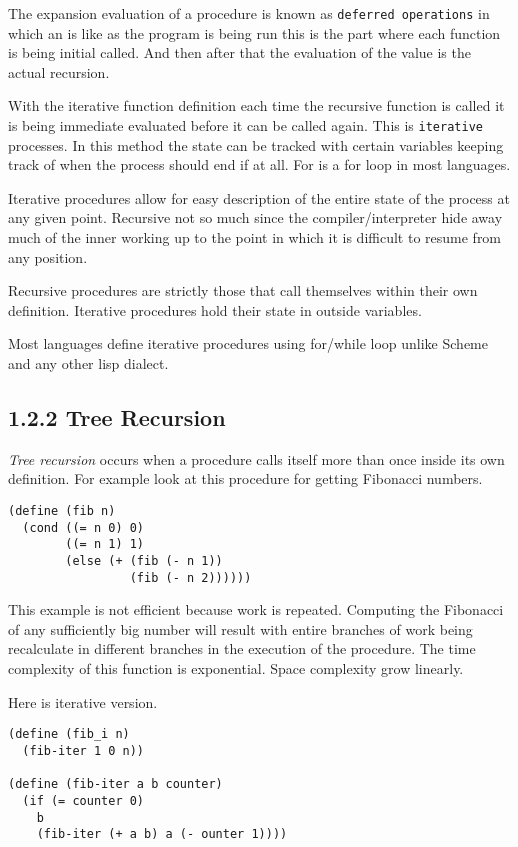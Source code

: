 \documentclass[11pt]{article}
\begin{document}
The expansion evaluation of a procedure is known as
\texttt{deferred operations} in which an is like as the program is being run
this is the part where each function is being initial called. And then
after that the evaluation of the value is the actual recursion.

With the iterative function definition each time the recursive function
is called it is being immediate evaluated before it can be called again.
This is \texttt{iterative} processes. In this method the state can be tracked
with certain variables keeping track of when the process should end if
at all. For is a for loop in most languages.

Iterative procedures allow for easy description of the entire state of
the process at any given point. Recursive not so much since the
compiler/interpreter hide away much of the inner working up to the point
in which it is difficult to resume from any position.

Recursive procedures are strictly those that call themselves within
their own definition. Iterative procedures hold their state in outside
variables.

Most languages define iterative procedures using for/while loop unlike
Scheme and any other lisp dialect.

\subsection{1.2.2 Tree Recursion}
\label{sec:org854cb8f}
\emph{Tree recursion} occurs when a procedure calls itself more than once
inside its own definition. For example look at this procedure for
getting Fibonacci numbers.

\begin{verbatim}
(define (fib n)
  (cond ((= n 0) 0)
        ((= n 1) 1)
        (else (+ (fib (- n 1))
                 (fib (- n 2))))))
\end{verbatim}

This example is not efficient because work is repeated. Computing the
Fibonacci of any sufficiently big number will result with entire
branches of work being recalculate in different branches in the
execution of the procedure. The time complexity of this function is
exponential. Space complexity grow linearly.

Here is iterative version.

\begin{verbatim}
(define (fib_i n)
  (fib-iter 1 0 n))

(define (fib-iter a b counter)
  (if (= counter 0)
    b
    (fib-iter (+ a b) a (- ounter 1))))
\end{verbatim}
\end{document}
